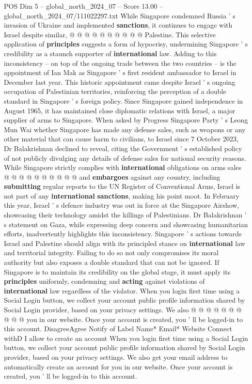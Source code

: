 \begin{textsample}{POS Dim 5 – global\_north\_2024\_07 – Score 13.00 – global\_north\_2024\_07/111022297.txt}
While Singapore condemned Russia ' s invasion of Ukraine and implemented \textbf{sanctions}, it continues to engage with Israel despite similar, @ @ @ @ @ @ @ @ @ @ Palestine.
This selective application of \textbf{principles} suggests a form of hypocrisy, undermining Singapore ' s credibility as a staunch supporter of \textbf{international} law.
Adding to this inconsistency -- on top of the ongoing trade between the two countries -- is the appointment of Ian Mak as Singapore ' s first resident ambassador to Israel in December last year.
This historic appointment came despite Israel ' s ongoing occupation of Palestinian territories, reinforcing the perception of a double standard in Singapore ' s foreign policy.
Since Singapore gained independence in August 1965, it has maintained close diplomatic relations with Israel, a major supplier of arms to Singapore.
When asked by Progress Singapore Party ' s Leong Mun Wai whether Singapore has made any defense sales, such as weapons or any other material that can cause harm to civilians, to Israel since 7 October 2023, Dr Balakrishnan declined to reveal, citing the Government ' s established policy of not publicly divulging any details of defense sales for national security reasons.
While Singapore strictly complies with \textbf{international} obligations on arms sales @ @ @ @ @ @ @ @ @ @ and \textbf{embargoes} against any country, including \textbf{submitting} regular reports to the UN Register of Conventional Arms, Israel is not part of any \textbf{international} \textbf{sanctions}, making his point moot.
In February this year, Israel ' s defence industry was out in force at the Singapore Airshow, showcasing their technology amidst the killings of Palestinians.
Dr Balakrishnan ' s statement on Gaza, while expressing deep concern and showcasing humanitarian efforts, inadvertently highlights this inconsistency.
Singapore ' s actions towards Israel and Palestine should align with its principled stance on \textbf{international} law and territorial integrity.
Failing to do so not only compromises its moral authority but also exposes a double standard that can not be ignored.
If Singapore is to maintain its credibility on the global stage, it must apply its \textbf{principles} uniformly, condemning and \textbf{acting} against violations of \textbf{international} law regardless of the violator.
When you login first time using a Social Login button, we collect your account public profile information shared by Social Login provider, based on your privacy settings.
We also @ @ @ @ @ @ @ @ @ @ you in our website.
Once your account is created, you ' ll be logged-in to this account.
DisagreeAgree Notify of Label Name* Email* Website Connect withD I allow to create an account When you login first time using a Social Login button, we collect your account public profile information shared by Social Login provider, based on your privacy settings.
We also get your email address to automatically create an account for you in our website.
Once your account is created, you ' ll be logged-in to this account.

\end{textsample}
